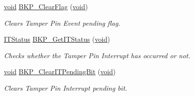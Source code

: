 \begin{DoxyCompactItemize}
\hyperlink{usb__devapi_8h_afabf60e7f57651d6d595a02c75f07cd0}{void} \hyperlink{group___b_k_p___exported___functions_ga3f3aea5b0a3d8d5d79b0b506928351ea}{B\+K\+P\+\_\+\+Clear\+Flag} (\hyperlink{usb__devapi_8h_afabf60e7f57651d6d595a02c75f07cd0}{void})
\begin{DoxyCompactList}\small\item\em Clears Tamper Pin Event pending flag. \end{DoxyCompactList}\item 
\hyperlink{agilefox_2library_2inc_2stm32f10x__type_8h_aacbd7ed539db0aacd973a0f6eca34074}{I\+T\+Status} \hyperlink{group___b_k_p___exported___functions_ga99566c9f1f17f499020606cb63511494}{B\+K\+P\+\_\+\+Get\+I\+T\+Status} (\hyperlink{usb__devapi_8h_afabf60e7f57651d6d595a02c75f07cd0}{void})
\begin{DoxyCompactList}\small\item\em Checks whether the Tamper Pin Interrupt has occurred or not. \end{DoxyCompactList}\item 
\hyperlink{usb__devapi_8h_afabf60e7f57651d6d595a02c75f07cd0}{void} \hyperlink{group___b_k_p___exported___functions_ga6a93ef8e40959bb10fea670e2040ad74}{B\+K\+P\+\_\+\+Clear\+I\+T\+Pending\+Bit} (\hyperlink{usb__devapi_8h_afabf60e7f57651d6d595a02c75f07cd0}{void})
\begin{DoxyCompactList}\small\item\em Clears Tamper Pin Interrupt pending bit. \end{DoxyCompactList}\end{DoxyCompactItemize}
